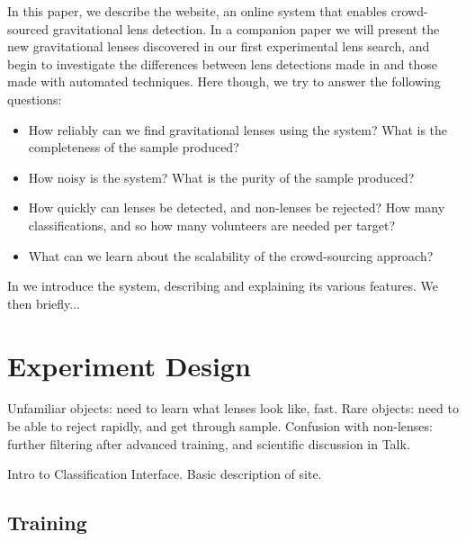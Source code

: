 \documentclass[useAMS,usenatbib,a4paper]{mn2e}
\begin{document}
In this paper, we describe the \sw website, an online system that enables 
crowd-sourced gravitational lens detection.  In a companion paper we will
present the new gravitational lenses discovered in our first experimental lens
search, and begin to investigate the differences between lens detections made
in \sw and those made with automated techniques. Here though, we try to answer
the following questions:

\begin{itemize}

\item How reliably can we find gravitational lenses using the \sw
system? What is the completeness of the sample produced?

\item How noisy is the system? What is the purity of the sample
produced?

\item How quickly can lenses be detected, and non-lenses be rejected?
How many classifications, and so how many volunteers are needed per target?

\item What can we learn about the scalability of the crowd-sourcing approach?

\end{itemize}

In  we introduce the \sw system, describing and
explaining its various features. We then briefly...




\section{Experiment Design}
\label{sec:design}

Unfamiliar objects: need to learn what lenses look like, fast. Rare
objects: need to be able to reject rapidly, and get through sample.
Confusion with non-lenses: further filtering after advanced training, and 
scientific discussion in Talk.

Intro to Classification Interface. Basic description of site. 


\subsection{Training}
\label{sec:design:training}
\end{document}
